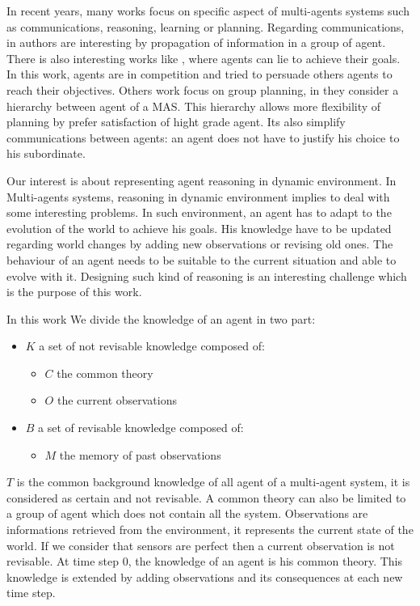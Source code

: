 \documentclass{aamas2012}
\begin{document}
	In recent years, many works focus on specific aspect of multi-agents systems such as communications, reasoning, learning or planning.
	Regarding communications, in \cite{DBLP:conf/ecai/BourgneIM10, DBLP:conf/lads/BourgneIM10} authors are interesting 
	by propagation of information in a group of agent.
	There is also interesting works like \cite{DBLP:conf/ijcai/SakamaSP11}, where agents can lie to achieve their goals.
	In this work, agents are in competition and tried to persuade others agents to reach their objectives.
	Others work focus on group planning, in \cite{DBLP:conf/clima/NieuwenborghVHV06} they consider a hierarchy between agent of a MAS.
	This hierarchy allows more flexibility of planning by prefer satisfaction of hight grade agent.
	Its also simplify communications between agents: an agent does not have to justify his choice to his subordinate.
	
	Our interest is about representing agent reasoning in dynamic environment.
	In Multi-agents systems, reasoning in dynamic environment implies to deal with some interesting problems.
	In such environment, an agent has to adapt to the evolution of the world to achieve his goals.
	His knowledge have to be updated regarding world changes by adding new observations or revising old ones.
	The behaviour of an agent needs to be suitable to the current situation and able to evolve with it.
	Designing such kind of reasoning is an interesting challenge which is the purpose of this work.

	In this work We divide the knowledge of an agent in two part:\newline
		\begin{itemize}
			\item $K$ a set of not revisable knowledge composed of:
			\begin{itemize}
				\item $C$ the common theory
				\item $O$ the current observations
			\end{itemize}
			\item $B$ a set of revisable knowledge composed of:
			\begin{itemize}
				\item $M$ the memory of past observations 
			\end{itemize}
		\end{itemize}
	
	$T$ is the common background knowledge of all agent of a multi-agent system, it is considered as certain and not revisable.
	A common theory can also be limited to a group of agent which does not contain all the system.
	Observations are informations retrieved from the environment, it represents the current state of the world.
	If we consider that sensors are perfect then a current observation is not revisable.
	At time step 0, the knowledge of an agent is his common theory.
	This knowledge is extended by adding observations and its consequences at each new time step.
\end{document}

